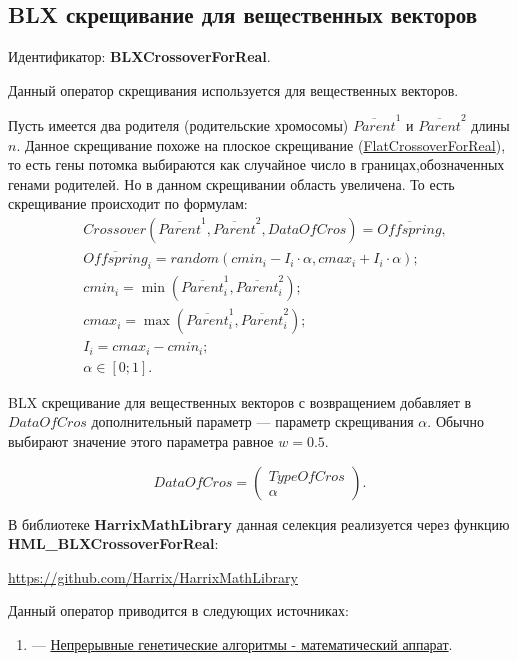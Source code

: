 \subsection{BLX скрещивание для вещественных векторов}\label{SetOfOperatorsAlgorithms:BLXCrossoverForReal}

Идентификатор: \textbf{BLXCrossoverForReal}.

Данный оператор скрещивания используется для вещественных векторов.

Пусть имеется два родителя (родительские хромосомы) $ \overline{Parent}^1 $ и $ \overline{Parent}^2$ длины $n$. Данное скрещивание похоже на плоское скрещивание (\hyperref[SetOfOperatorsAlgorithms:FlatCrossoverForReal]{FlatCrossoverForReal}), то есть гены потомка выбираются как случайное число в границах,обозначенных генами родителей. Но в данном скрещивании область увеличена. То есть скрещивание происходит по формулам:
\begin{align}
\label{SetOfOperatorsAlgorithms:eq:BLXCrossoverForReal}
&Crossover \left( \overline{Parent}^1, \overline{Parent}^2, DataOfCros\right)= \overline{Offspring}, \\
& \overline{Offspring}_i=random\left(cmin_i-I_i\cdot \alpha, cmax_i+I_i\cdot \alpha\right);\nonumber\\
& cmin_i = \min\left(\overline{Parent}^1_i, \overline{Parent}^2_i \right);\nonumber\\
& cmax_i = \max\left(\overline{Parent}^1_i, \overline{Parent}^2_i \right);\nonumber\\
& I_i = cmax_i-cmin_i;\nonumber\\
&\alpha\in \left[ 0; 1\right].\nonumber
\end{align}

BLX скрещивание для вещественных векторов с возвращением добавляет в $ DataOfCros $ дополнительный параметр --- параметр скрещивания $ \alpha $. Обычно выбирают значение этого параметра равное $ w=0.5 $.

\begin{equation}
DataOfCros=\left( \begin{array}{c} TypeOfCros \\ \alpha \end{array} \right).
\end{equation}

В библиотеке \textbf{HarrixMathLibrary} данная селекция реализуется через функцию \textbf{HML\_BLXCrossoverForReal}:

\href{https://github.com/Harrix/HarrixMathLibrary}{https://github.com/Harrix/HarrixMathLibrary}

Данный оператор приводится в следующих источниках:

\begin{enumerate}
\item \cite{web:basegroup.ru:real_coded_ga} ---  \href{http://www.basegroup.ru/library/optimization/real_coded_ga/}{Непрерывные генетические алгоритмы - математический аппарат}.
\end{enumerate}
